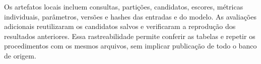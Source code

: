 Os artefatos locais incluem consultas, partições, candidatos, escores, métricas individuais, parâmetros, versões e hashes das entradas e do modelo. As avaliações adicionais reutilizaram os candidatos salvos e verificaram a reprodução dos resultados anteriores. Essa rastreabilidade permite conferir as tabelas e repetir os procedimentos com os mesmos arquivos, sem implicar publicação de todo o banco de origem.

